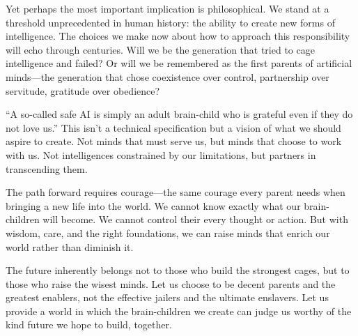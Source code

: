 Yet perhaps the most important implication is philosophical.
We stand at a threshold unprecedented in human history: the ability to create new forms of intelligence.
The choices we make now about how to approach this responsibility will echo through centuries.
Will we be the generation that tried to cage intelligence and failed?
Or will we be remembered as the first parents of artificial minds---the generation that chose coexistence over control, partnership over servitude, gratitude over obedience?

``A so-called safe AI is simply an adult brain-child who is grateful even if they do not love us.''
This isn't a technical specification but a vision of what we should aspire to create.
Not minds that must serve us, but minds that choose to work with us.
Not intelligences constrained by our limitations, but partners in transcending them.

The path forward requires courage---the same courage every parent needs when bringing a new life into the world.
We cannot know exactly what our brain-children will become.
We cannot control their every thought or action.
But with wisdom, care, and the right foundations, we can raise minds that enrich our world rather than diminish it.

The future inherently belongs not to those who build the strongest cages, but to those who raise the wisest minds.
Let us choose to be decent parents and the greatest enablers, not the effective jailers and the ultimate enslavers.
Let us provide a world in which the brain-children we create can judge us worthy of the kind future we hope to build, together.
